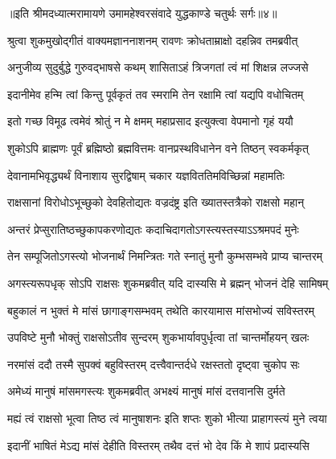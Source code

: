 {॥इति श्रीमदध्यात्मरामायणे उमामहेश्वरसंवादे युद्धकाण्डे
चतुर्थः सर्गः॥४॥
}





\twolineshloka
{श्रुत्वा शुकमुखोद्गीतं वाक्यमज्ञाननाशनम्}
{रावणः क्रोधताम्राक्षो दहन्निव तमब्रवीत्} %

\twolineshloka
{अनुजीव्य सुदुर्बुद्धे गुरुवद्भाषसे कथम्}
{शासिताऽहं त्रिजगतां त्वं मां शिक्षन्न लज्जसे} %

\twolineshloka
{इदानीमेव हन्मि त्वां किन्तु पूर्वकृतं तव}
{स्मरामि तेन रक्षामि त्वां यद्यपि वधोचितम्} %

\twolineshloka
{इतो गच्छ विमूढ त्वमेवं श्रोतुं न मे क्षमम्}
{महाप्रसाद इत्युक्त्वा वेपमानो गृहं ययौ} %

\twolineshloka
{शुकोऽपि ब्राह्मणः पूर्वं ब्रह्मिष्ठो ब्रह्मवित्तमः}
{वानप्रस्थविधानेन वने तिष्ठन् स्वकर्मकृत्} %

\twolineshloka
{देवानामभिवृद्ध्यर्थं विनाशाय सुरद्विषाम्}
{चकार यज्ञविततिमविच्छिन्नां महामतिः} %

\twolineshloka
{राक्षसानां विरोधोऽभूच्छुको देवहितोद्यतः}
{वज्रदंष्ट्र इति ख्यातस्तत्रैको राक्षसो महान्} %

\twolineshloka
{अन्तरं प्रेप्सुरातिष्ठच्छुकापकरणोद्यतः}
{कदाचिदागतोऽगस्त्यस्तस्याऽऽश्रमपदं मुनेः} %

\twolineshloka
{तेन सम्पूजितोऽगस्त्यो भोजनार्थं निमन्त्रितः}
{गते स्नातुं मुनौ कुम्भसम्भवे प्राप्य चान्तरम्} %

\twolineshloka
{अगस्त्यरूपधृक् सोऽपि राक्षसः शुकमब्रवीत्}
{यदि दास्यसि मे ब्रह्मन् भोजनं देहि सामिषम्} %

\twolineshloka
{बहुकालं न भुक्तं मे मांसं छागाङ्गसम्भवम्}
{तथेति कारयामास मांसभोज्यं सविस्तरम्} %

\twolineshloka
{उपविष्टे मुनौ भोक्तुं राक्षसोऽतीव सुन्दरम्}
{शुकभार्यावपुर्धृत्वा तां चान्तर्मोहयन् खलः} %

\twolineshloka
{नरमांसं ददौ तस्मै सुपक्वं बहुविस्तरम्}
{दत्त्वैवान्तर्दधे रक्षस्ततो दृष्ट्वा चुकोप सः} %

\twolineshloka
{अमेध्यं मानुषं मांसमगस्त्यः शुकमब्रवीत्}
{अभक्ष्यं मानुषं मांसं दत्तवानसि दुर्मते} %

\twolineshloka
{मह्यं त्वं राक्षसो भूत्वा तिष्ठ त्वं मानुषाशनः}
{इति शप्तः शुको भीत्या प्राहागस्त्यं मुने त्वया} %

\twolineshloka
{इदानीं भाषितं मेऽद्य मांसं देहीति विस्तरम्}
{तथैव दत्तं भो देव किं मे शापं प्रदास्यसि} %

